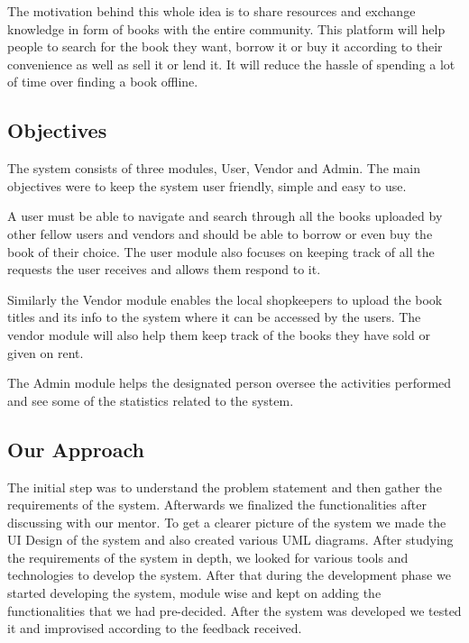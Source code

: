 \documentclass[conference]{IEEEtran}
\begin{document}
The motivation behind this whole idea is to share resources and exchange knowledge in form of books with the entire community. This platform will help people to search for the book they want, borrow it or buy it according to their convenience as well as sell it or lend it. It will reduce the hassle of spending a lot of time over finding a book offline.

\subsection{Objectives}
The system consists of three modules, User, Vendor and Admin. The main objectives were to keep the system user friendly, simple and easy to use.

A user must be able to navigate and search through all the books uploaded by other fellow users and vendors and should be able to borrow or even buy the book of their choice. The user module also focuses on keeping track of all the requests the user receives and allows them respond to it.

Similarly the Vendor module enables the local shopkeepers to upload the book titles and its info to the system where it can be accessed by the users. The vendor module will also help them keep track of the books they have sold or given on rent.

The Admin module helps the designated person oversee the activities performed and see some of the statistics related to the system. 
\subsection{Our Approach}
The initial step was to understand the problem statement and then gather the requirements of the system. Afterwards we finalized the functionalities after discussing with our mentor. To get a clearer picture of the system we made the UI Design of the system and also created various UML diagrams. After studying the requirements of the system in depth, we looked for various tools and technologies to develop the system. After that during the development phase we started developing the system, module wise and kept on adding the functionalities that we had pre-decided. After the system was developed we tested it and improvised according to the feedback received.

\end{document}
